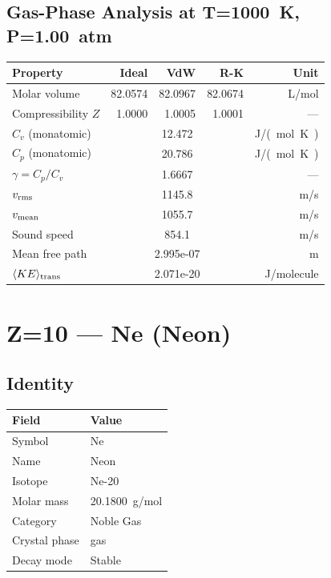 \documentclass[11pt,a4paper]{article}
\begin{document}
\subsection{Gas-Phase Analysis at T=\SI{1000}{K}, P=\SI{1.00}{atm}}
\begin{tabular}{lrrrr}
  \toprule
  Property & Ideal & VdW & R-K & Unit \\
  \midrule
  Molar volume & 82.0574 & 82.0967 & 82.0674 & \si{L/mol} \\
  Compressibility $Z$ & 1.0000 & 1.0005 & 1.0001 & --- \\
  \midrule
  $C_v$ (monatomic) & \multicolumn{3}{c}{12.472} & \si{J/(mol.K)} \\
  $C_p$ (monatomic) & \multicolumn{3}{c}{20.786} & \si{J/(mol.K)} \\
  $\gamma = C_p/C_v$ & \multicolumn{3}{c}{1.6667} & --- \\
  $v_{\rm rms}$ & \multicolumn{3}{c}{1145.8} & \si{m/s} \\
  $v_{\rm mean}$ & \multicolumn{3}{c}{1055.7} & \si{m/s} \\
  Sound speed & \multicolumn{3}{c}{854.1} & \si{m/s} \\
  Mean free path & \multicolumn{3}{c}{2.995e-07} & \si{m} \\
  $\langle KE \rangle_{\rm trans}$ & \multicolumn{3}{c}{2.071e-20} & \si{J/molecule} \\
  \bottomrule
\end{tabular}

\newpage

\section{Z=10 --- Ne (Neon)}
\label{sec:Z10}

\subsection{Identity}
\begin{tabular}{ll}
  \toprule
  Field & Value \\
  \midrule
  Symbol & Ne \\
  Name & Neon \\
  Isotope & Ne-20 \\
  Molar mass & \SI{20.1800}{g/mol} \\
  Category & Noble Gas \\
  Crystal phase & gas \\
  Decay mode & Stable \\
  \bottomrule
\end{tabular}
\end{document}
